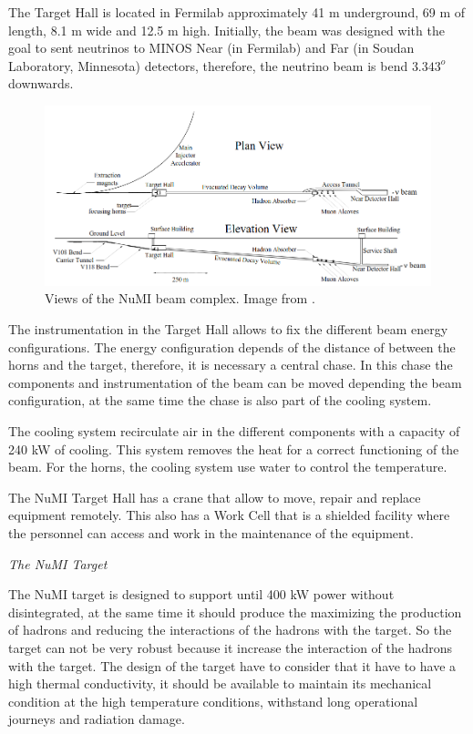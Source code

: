 The Target Hall is located in Fermilab approximately 41 m underground, 69 m of length, 8.1 m wide and 12.5 m high. Initially, the beam was designed with the goal to sent neutrinos to MINOS Near (in Fermilab) and Far (in Soudan Laboratory, Minnesota) detectors, therefore, the neutrino beam is bend $3.343^o$ downwards.  

\begin{figure}[!htb]
\centering
\includegraphics[scale=0.4]{Figures/Chapter2/NuMIFacilityViews.png}
        \caption{Views of the NuMI beam complex. Image from \cite{Numi}.} 
\label{fig:MnvExp:NuMI:NuMIviews}
\end{figure}

The instrumentation in the Target Hall allows to fix the different beam energy configurations. The energy configuration depends of the distance of between the horns and the target, therefore, it is necessary a central chase. In this chase the components and instrumentation of the beam can be moved depending the beam configuration, at  the same time the chase is also part of the cooling system. 

The cooling system recirculate air in the different components with a capacity of 240 kW of cooling. This system removes the heat for a correct functioning of the beam. For the horns, the cooling system use water to control the temperature.

The NuMI Target Hall has a crane that allow to move, repair and replace equipment remotely. This also has a Work Cell that is a shielded facility where the personnel can access and work in the maintenance of the equipment. 

\textit{The NuMI Target}

The NuMI target is designed to support until 400 kW power without disintegrated, at the same time it should produce the maximizing the production of hadrons and reducing the interactions of the hadrons with the target. So the target can not be very robust because it increase the interaction of the hadrons with the target. The design of the target have to consider that it have to have a high thermal conductivity, it should be available to maintain its mechanical condition at the high temperature conditions, withstand long operational journeys and radiation damage. 

